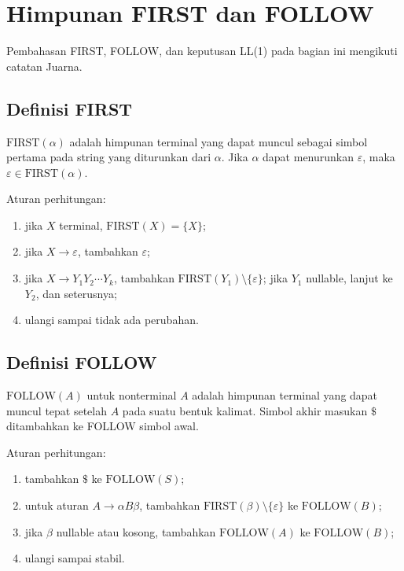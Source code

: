 \section{Himpunan FIRST dan FOLLOW}
\label{sec:ch10-first-follow}

Pembahasan FIRST, FOLLOW, dan keputusan LL(1) pada bagian ini mengikuti
catatan Juarna.

\subsection{Definisi FIRST}

\begin{definisi}[FIRST]
\(\text{FIRST}(\alpha)\) adalah himpunan terminal yang dapat muncul
sebagai simbol pertama pada string yang diturunkan dari \(\alpha\).
Jika \(\alpha\) dapat menurunkan \(\varepsilon\), maka
\(\varepsilon \in \text{FIRST}(\alpha)\).
\end{definisi}

Aturan perhitungan:
\begin{enumerate}[label=\arabic*.,leftmargin=*]
  \item jika \(X\) terminal, \(\text{FIRST}(X) = \{X\}\);
  \item jika \(X \to \varepsilon\), tambahkan \(\varepsilon\);
  \item jika \(X \to Y_1Y_2\cdots Y_k\), tambahkan
        \(\text{FIRST}(Y_1) \setminus \{\varepsilon\}\); jika
        \(Y_1\) nullable, lanjut ke \(Y_2\), dan seterusnya;
  \item ulangi sampai tidak ada perubahan.
\end{enumerate}

\subsection{Definisi FOLLOW}

\begin{definisi}[FOLLOW]
\(\text{FOLLOW}(A)\) untuk nonterminal \(A\) adalah himpunan terminal
yang dapat muncul tepat setelah \(A\) pada suatu bentuk kalimat.
Simbol akhir masukan \(\$\) ditambahkan ke FOLLOW simbol awal.
\end{definisi}

Aturan perhitungan:
\begin{enumerate}[label=\arabic*.,leftmargin=*]
  \item tambahkan \(\$\) ke \(\text{FOLLOW}(S)\);
  \item untuk aturan \(A \to \alpha B \beta\), tambahkan
        \(\text{FIRST}(\beta) \setminus \{\varepsilon\}\) ke
        \(\text{FOLLOW}(B)\);
  \item jika \(\beta\) nullable atau kosong, tambahkan
        \(\text{FOLLOW}(A)\) ke \(\text{FOLLOW}(B)\);
  \item ulangi sampai stabil.
\end{enumerate}

